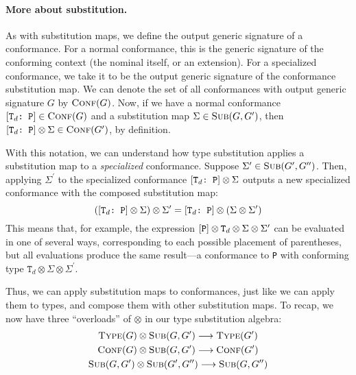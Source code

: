 \documentclass[../generics]{subfiles}
\begin{document}
\paragraph{More about substitution.} As with substitution maps, we define the output generic signature of a conformance. For a normal conformance, this is the generic signature of the conforming context (the nominal itself, or an extension). For a specialized conformance, we take it to be the output generic signature of the conformance substitution map. We can denote the set of all conformances with output generic signature $G$ by $\textsc{Conf}({G})$. Now, if we have a normal conformance $[\texttt{$\texttt{T}_d$:~P}]\in\textsc{Conf}({G})$ and a substitution map $\Sigma\in\textsc{Sub}({G, G^\prime})$, then $[\texttt{$\texttt{T}_d$:~P}]\otimes\Sigma\in\textsc{Conf}({G^\prime})$, by definition.

With this notation, we can understand how type substitution applies a substitution map to a \emph{specialized} conformance. Suppose $\Sigma^\prime\in\textsc{Sub}({G^\prime, G^{\prime\prime}})$. Then, applying $\Sigma^\prime$ to the specialized conformance $[\texttt{$\texttt{T}_d$:~P}]\otimes\Sigma$ outputs a new specialized conformance with the composed substitution map:
\[([\texttt{$\texttt{T}_d$:~P}]\otimes\Sigma)\otimes\Sigma^\prime=[\texttt{$\texttt{T}_d$:~P}]\otimes(\Sigma\otimes\Sigma^\prime)\]
This means that, for example, the expression $[\texttt{P}]\otimes\texttt{T}_d\otimes\Sigma\otimes\Sigma^\prime$ can be evaluated in one of several ways, corresponding to each possible placement of parentheses, but all evaluations produce the same result---a conformance to \texttt{P} with conforming type $\texttt{T}_d\otimes\Sigma\otimes\Sigma^\prime$.

Thus, we can apply substitution maps to conformances, just like we can apply them to types, and compose them with other substitution maps. To recap, we now have three ``overloads'' of \index{$\otimes$}$\otimes$ in our type substitution algebra:
\begin{gather*}
\textsc{Type}({G})\otimes\textsc{Sub}({G, G^\prime})\longrightarrow\textsc{Type}({G^\prime})\\
\textsc{Conf}({G})\otimes\textsc{Sub}({G, G^\prime})\longrightarrow\textsc{Conf}({G^\prime})\\
\textsc{Sub}({G, G^\prime})\otimes\textsc{Sub}({G^\prime, G^{\prime\prime}})\longrightarrow\textsc{Sub}({G, G^{\prime\prime}})
\end{gather*}
\end{document}
